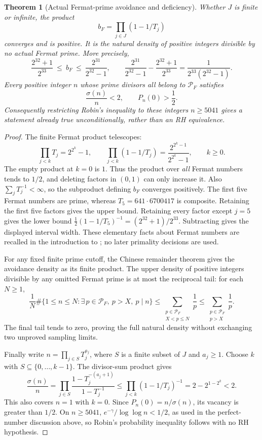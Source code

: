 \documentclass[11pt]{article}
\newtheorem{theorem}{Theorem}[section]
\theoremstyle{definition}
\begin{document}
\begin{theorem}[Actual Fermat-prime avoidance and deficiency]
\label{thm:actual-fermat-avoidance}
Whether $J$ is finite or infinite, the product
\[
 b_F=\prod_{j\in J}(1-1/T_j)
\]
converges and is positive. It is the natural density of positive
integers divisible by no actual Fermat prime. More precisely,
\[
 \frac{2^{32}+1}{2^{33}}
 \ \le\ b_F\ \le\ \frac{2^{31}}{2^{32}-1},\qquad
 \frac{2^{31}}{2^{32}-1}-\frac{2^{32}+1}{2^{33}}
 =\frac1{2^{33}(2^{32}-1)}.
\]
Every positive integer $n$ whose prime divisors all belong to
$\mathcal P_F$ satisfies
\[
 \frac{\sigma(n)}n<2,\qquad P_n(0)>\frac12.
\]
Consequently restricting Robin's inequality to these integers
$n\ge5041$ gives a statement already true unconditionally,
rather than an RH equivalence.
\end{theorem}

\begin{proof}
The finite Fermat product telescopes:
\[
 \prod_{j<k}T_j=2^{2^k}-1,\qquad
 \prod_{j<k}(1-1/T_j)
 =\frac{2^{2^k-1}}{2^{2^k}-1},\qquad k\ge0.
\]
The empty product at $k=0$ is $1$. Thus the product over
\emph{all} Fermat numbers tends to $1/2$, and deleting factors
in $(0,1)$ can only increase it. Also
$\sum_jT_j^{-1}<\infty$, so the subproduct defining $b_F$
converges positively. The first five Fermat numbers are prime,
whereas $T_5=641\cdot6700417$ is composite. Retaining the first
five factors gives the upper bound. Retaining every factor
except $j=5$ gives the lower bound
$\tfrac12(1-1/T_5)^{-1}=(2^{32}+1)/2^{33}$.
Subtracting gives the displayed interval width. These elementary
facts about Fermat numbers are recalled in the introduction to
\cite{PomeranceCyclotomic}; no later primality decisions are used.

For any fixed finite prime cutoff, the Chinese remainder theorem
gives the avoidance density as its finite product. The upper
density of positive integers divisible by any omitted Fermat
prime is at most the reciprocal tail: for each $N\ge1$,
\[
 \frac1N\#\{1\le n\le N:\exists\,p\in\mathcal P_F,
                      \ p>X,\ p\mid n\}
 \le\sum_{\substack{p\in\mathcal P_F\\X<p\le N}}\frac1p
 \le\sum_{\substack{p\in\mathcal P_F\\p>X}}\frac1p.
\]
The final tail tends to zero, proving the full natural density
without exchanging two unproved sampling limits.

Finally write $n=\prod_{j\in S}T_j^{a_j}$, where $S$ is a
finite subset of $J$ and $a_j\ge1$. Choose $k$ with
$S\subseteq\{0,\ldots,k-1\}$. The divisor-sum product gives
\[
 \frac{\sigma(n)}n
 =\prod_{j\in S}
    \frac{1-T_j^{-(a_j+1)}}{1-T_j^{-1}}
 \le\prod_{j<k}(1-1/T_j)^{-1}
 =2-2^{1-2^k}<2.
\]
This also covers $n=1$ with $k=0$.
Since $P_n(0)=n/\sigma(n)$, its vacancy is greater than $1/2$.
On $n\ge5041$, $e^{-\gamma}/\log\log n<1/2$, as used in
the perfect-number discussion above, so Robin's probability
inequality follows with no RH hypothesis.
\end{proof}
\end{document}
